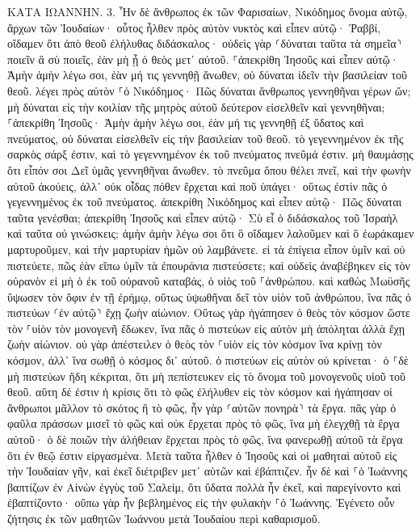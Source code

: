 \documentclass[twoside, 9pt]{extreport}
\begin{document}
ΚΑΤΑ ΙΩΑΝΝΗΝ.
3.
Ἦν δὲ ἄνθρωπος ἐκ τῶν Φαρισαίων, Νικόδημος ὄνομα αὐτῷ, ἄρχων τῶν Ἰουδαίων· 
οὗτος ἦλθεν πρὸς αὐτὸν νυκτὸς καὶ εἶπεν αὐτῷ· Ῥαββί, οἴδαμεν ὅτι ἀπὸ θεοῦ ἐλήλυθας διδάσκαλος· οὐδεὶς γὰρ ⸂δύναται ταῦτα τὰ σημεῖα⸃ ποιεῖν ἃ σὺ ποιεῖς, ἐὰν μὴ ᾖ ὁ θεὸς μετ᾽ αὐτοῦ. 
⸀ἀπεκρίθη Ἰησοῦς καὶ εἶπεν αὐτῷ· Ἀμὴν ἀμὴν λέγω σοι, ἐὰν μή τις γεννηθῇ ἄνωθεν, οὐ δύναται ἰδεῖν τὴν βασιλείαν τοῦ θεοῦ. 
λέγει πρὸς αὐτὸν ⸀ὁ Νικόδημος· Πῶς δύναται ἄνθρωπος γεννηθῆναι γέρων ὤν; μὴ δύναται εἰς τὴν κοιλίαν τῆς μητρὸς αὐτοῦ δεύτερον εἰσελθεῖν καὶ γεννηθῆναι; 
⸀ἀπεκρίθη Ἰησοῦς· Ἀμὴν ἀμὴν λέγω σοι, ἐὰν μή τις γεννηθῇ ἐξ ὕδατος καὶ πνεύματος, οὐ δύναται εἰσελθεῖν εἰς τὴν βασιλείαν τοῦ θεοῦ. 
τὸ γεγεννημένον ἐκ τῆς σαρκὸς σάρξ ἐστιν, καὶ τὸ γεγεννημένον ἐκ τοῦ πνεύματος πνεῦμά ἐστιν. 
μὴ θαυμάσῃς ὅτι εἶπόν σοι Δεῖ ὑμᾶς γεννηθῆναι ἄνωθεν. 
τὸ πνεῦμα ὅπου θέλει πνεῖ, καὶ τὴν φωνὴν αὐτοῦ ἀκούεις, ἀλλ᾽ οὐκ οἶδας πόθεν ἔρχεται καὶ ποῦ ὑπάγει· οὕτως ἐστὶν πᾶς ὁ γεγεννημένος ἐκ τοῦ πνεύματος. 
ἀπεκρίθη Νικόδημος καὶ εἶπεν αὐτῷ· Πῶς δύναται ταῦτα γενέσθαι; 
ἀπεκρίθη Ἰησοῦς καὶ εἶπεν αὐτῷ· Σὺ εἶ ὁ διδάσκαλος τοῦ Ἰσραὴλ καὶ ταῦτα οὐ γινώσκεις; 
ἀμὴν ἀμὴν λέγω σοι ὅτι ὃ οἴδαμεν λαλοῦμεν καὶ ὃ ἑωράκαμεν μαρτυροῦμεν, καὶ τὴν μαρτυρίαν ἡμῶν οὐ λαμβάνετε. 
εἰ τὰ ἐπίγεια εἶπον ὑμῖν καὶ οὐ πιστεύετε, πῶς ἐὰν εἴπω ὑμῖν τὰ ἐπουράνια πιστεύσετε; 
καὶ οὐδεὶς ἀναβέβηκεν εἰς τὸν οὐρανὸν εἰ μὴ ὁ ἐκ τοῦ οὐρανοῦ καταβάς, ὁ υἱὸς τοῦ ⸀ἀνθρώπου. 
καὶ καθὼς Μωϋσῆς ὕψωσεν τὸν ὄφιν ἐν τῇ ἐρήμῳ, οὕτως ὑψωθῆναι δεῖ τὸν υἱὸν τοῦ ἀνθρώπου, 
ἵνα πᾶς ὁ πιστεύων ⸂ἐν αὐτῷ⸃ ἔχῃ ζωὴν αἰώνιον. 
Οὕτως γὰρ ἠγάπησεν ὁ θεὸς τὸν κόσμον ὥστε τὸν ⸀υἱὸν τὸν μονογενῆ ἔδωκεν, ἵνα πᾶς ὁ πιστεύων εἰς αὐτὸν μὴ ἀπόληται ἀλλὰ ἔχῃ ζωὴν αἰώνιον. 
οὐ γὰρ ἀπέστειλεν ὁ θεὸς τὸν ⸀υἱὸν εἰς τὸν κόσμον ἵνα κρίνῃ τὸν κόσμον, ἀλλ᾽ ἵνα σωθῇ ὁ κόσμος δι᾽ αὐτοῦ. 
ὁ πιστεύων εἰς αὐτὸν οὐ κρίνεται· ὁ ⸀δὲ μὴ πιστεύων ἤδη κέκριται, ὅτι μὴ πεπίστευκεν εἰς τὸ ὄνομα τοῦ μονογενοῦς υἱοῦ τοῦ θεοῦ. 
αὕτη δέ ἐστιν ἡ κρίσις ὅτι τὸ φῶς ἐλήλυθεν εἰς τὸν κόσμον καὶ ἠγάπησαν οἱ ἄνθρωποι μᾶλλον τὸ σκότος ἢ τὸ φῶς, ἦν γὰρ ⸂αὐτῶν πονηρὰ⸃ τὰ ἔργα. 
πᾶς γὰρ ὁ φαῦλα πράσσων μισεῖ τὸ φῶς καὶ οὐκ ἔρχεται πρὸς τὸ φῶς, ἵνα μὴ ἐλεγχθῇ τὰ ἔργα αὐτοῦ· 
ὁ δὲ ποιῶν τὴν ἀλήθειαν ἔρχεται πρὸς τὸ φῶς, ἵνα φανερωθῇ αὐτοῦ τὰ ἔργα ὅτι ἐν θεῷ ἐστιν εἰργασμένα. 
Μετὰ ταῦτα ἦλθεν ὁ Ἰησοῦς καὶ οἱ μαθηταὶ αὐτοῦ εἰς τὴν Ἰουδαίαν γῆν, καὶ ἐκεῖ διέτριβεν μετ᾽ αὐτῶν καὶ ἐβάπτιζεν. 
ἦν δὲ καὶ ⸀ὁ Ἰωάννης βαπτίζων ἐν Αἰνὼν ἐγγὺς τοῦ Σαλείμ, ὅτι ὕδατα πολλὰ ἦν ἐκεῖ, καὶ παρεγίνοντο καὶ ἐβαπτίζοντο· 
οὔπω γὰρ ἦν βεβλημένος εἰς τὴν φυλακὴν ⸀ὁ Ἰωάννης. 
Ἐγένετο οὖν ζήτησις ἐκ τῶν μαθητῶν Ἰωάννου μετὰ Ἰουδαίου περὶ καθαρισμοῦ. 
\end{document}
